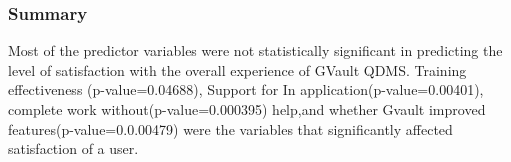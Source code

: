 \documentclass[
]{article}
\begin{document}
\hypertarget{summary}{%
\subsubsection{Summary}\label{summary}}

Most of the predictor variables were not statistically significant in
predicting the level of satisfaction with the overall experience of
GVault QDMS. Training effectiveness (p-value=0.04688), Support for In
application(p-value=0.00401), complete work without(p-value=0.000395)
help,and whether Gvault improved features(p-value=0.0.00479) were the
variables that significantly affected satisfaction of a user.
\end{document}
